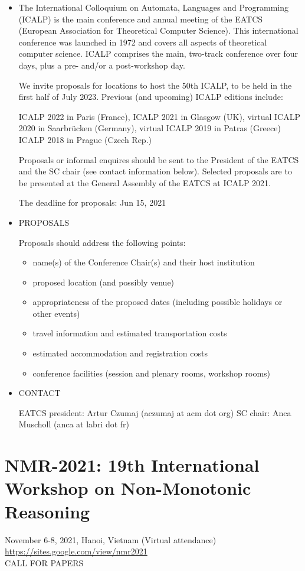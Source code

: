 \documentclass[prodmode,acmtecs]{acmsmall} %
\begin{document}
\begin{itemize}\item  The International Colloquium on Automata, Languages and Programming (ICALP) is the main conference and annual meeting of the EATCS (European Association for Theoretical Computer Science). This international conference was launched in 1972 and covers all aspects of theoretical computer science. ICALP comprises the main, two-track conference over four days, plus a pre- and/or a post-workshop day. 
 
  We invite proposals for locations to host the 50th ICALP, to be held in the first half of July 2023. Previous (and upcoming) ICALP editions include: 
 
  ICALP 2022 in Paris (France), ICALP 2021 in Glasgow (UK), virtual ICALP 2020 in Saarbrücken (Germany), virtual ICALP 2019 in Patras (Greece) ICALP 2018 in Prague (Czech Rep.)  
 
  Proposals or informal enquires should be sent to the President of the EATCS and the SC chair (see contact information below). Selected proposals are to be presented at the General Assembly of the EATCS at ICALP 2021. 
 
The deadline for proposals: Jun 15, 2021 
 
\item  PROPOSALS 
 
  Proposals should address the following points: 
 
\begin{itemize}\item  name(s) of the Conference Chair(s) and their host institution 
\item  proposed location (and possibly venue) 
\item  appropriateness of the proposed dates (including possible holidays or other events) 
\item  travel information and estimated transportation costs 
\item  estimated accommodation and registration costs 
\item  conference facilities (session and plenary rooms, workshop rooms)
\end{itemize} 
\item  CONTACT  
 
  EATCS president: Artur Czumaj (aczumaj at acm dot org) SC chair: Anca Muscholl (anca at labri dot fr)  
 
\end{itemize}\section{NMR-2021: 19th International Workshop on Non-Monotonic Reasoning }\label{NMR2021}  November 6-8, 2021, Hanoi, Vietnam (Virtual attendance)\\ 
  \href{https://sites.google.com/view/nmr2021}{https://sites.google.com/view/nmr2021}\\ 
CALL FOR PAPERS 
\end{document}

